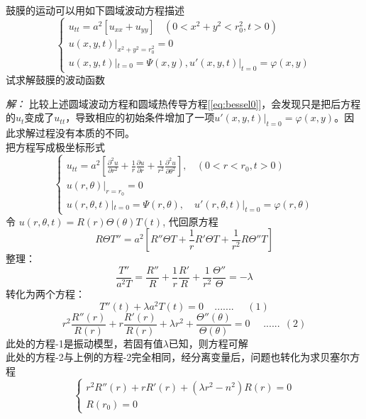 \begin{example}
	鼓膜的运动可以用如下圆域波动方程描述
	\begin{equation}\label{eq:bessel1}
		\begin{cases}
		u_{tt}=a^2 [u_{xx}   +u_{yy}] ~~~~ (0< x^2 +y^2 <r_0 ^2, t>0)\\
		u(x,y,t)|_{x^2+y^2=r_0 ^2}= 0 \\
		u(x,y,t)|_{t=0}= \Psi(x,y), u'(x,y,t)|_{t=0}= \varphi(x,y)
	\end{cases} 
   \end{equation}
试求解鼓膜的波动函数
\end{example}
\emph{解：}
比较上述圆域波动方程和圆域热传导方程[\ref{eq:bessel0}]，会发现只是把后方程的$u_{t}$变成了$u_{tt}$，导致相应的初始条件增加了一项$u'(x,y,t)|_{t=0}= \varphi(x,y)$。因此求解过程没有本质的不同。 \\
把方程写成极坐标形式
$$\begin{cases}
	\displaystyle	u_{tt}=a^2 [ {	\frac{\partial^2 u }{\partial r^2 } +\frac{1}{r } \frac{\partial u }{\partial r } +
	\frac{1}{r^2 } \frac{\partial ^2 u }{\partial \theta ^2
	} }], ~~~~ (0<r<r_0, t>0)\\
	u(r,\theta)|_{r=r_0}=0 	\\
	u(r,\theta,t)|_{t=0} = \Psi(r,\theta) ,\quad u'(r,\theta,t)|_{t=0}= \varphi(r,\theta)	
\end{cases} $$
令 $u(r,\theta,t) =R(r)\Theta(\theta)T(t)$,  代回原方程
	\begin{equation*}
		R\Theta T''=a^2 [ R'' \Theta T + \dfrac{1}{r} R' \Theta T  + \dfrac{1}{r^2} R \Theta '' T ]
	\end{equation*}
	整理：
	\begin{equation*}
		\frac{T''}{a^2T} =\frac{R''}{R}+\frac{1}{r} \frac{R'}{R} +\frac{1}{r^2} \frac{\Theta ''} {\Theta}  =-\lambda
	\end{equation*}
	转化为两个方程：
	\begin{equation*}
		T''(t)+\lambda a^2T(t)=0  ~~~~~....... ~~~~~~(1)
	\end{equation*}	
	\begin{equation*}
		r^2 \frac{R'' (r)}{R(r)}+r \frac{R'(r)}{R(r)} + \lambda r^2 +\frac{\Theta ''(\theta)} {\Theta (\theta)} =0  ~~~~~~......~~(2)
	\end{equation*}
	此处的方程-1是振动模型，若固有值$\lambda$已知，则方程可解\\
	此处的方程-2与上例的方程-2完全相同，经分离变量后，问题也转化为求贝塞尔方程
	\begin{equation*} 
		\begin{cases}
		r^2 R'' (r)+r R'(r) +( \lambda r^2 -n^2)R(r)=0  \\
		R(r_0)=0
	\end{cases} 
    \end{equation*}	

